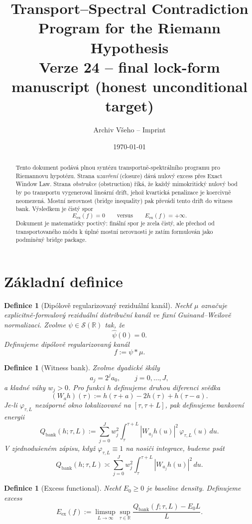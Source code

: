 \documentclass[11pt,a4paper]{article}
\title{Transport--Spectral Contradiction Program for the Riemann Hypothesis\\
\large Verze 24 -- final lock-form manuscript (honest unconditional target)}
\author{Archiv Všeho -- Imprint}
\date{\today}
\newtheorem{definition}[theorem]{Definice}
\begin{document}
\maketitle

\begin{abstract}
Tento dokument podává plnou syntézu transportně-spektrálního programu pro Riemannovu hypotézu.
Strana \emph{uzavření} (closure) dává nulový excess přes Exact Window Law.
Strana \emph{obstrukce} (obstruction) říká, že každý mimokritický nulový bod by po transportu
vygeneroval lineární drift, jehož kvartická penalizace je koercivně neomezená.
Mostní nerovnost (bridge inequality) pak převádí tento drift do witness bank.
Výsledkem je čistý spor
\[
E_{\mathrm{ex}}(f)=0
\qquad\text{versus}\qquad
E_{\mathrm{ex}}(f)=+\infty.
\]
Dokument je matematicky poctivý: finální spor je zcela čistý, ale přechod od transportovaného
módu k úplné mostní nerovnosti je zatím formulován jako podmíněný bridge package.
\end{abstract}

\section{Základní definice}

\begin{definition}[Dipólově regularizovaný reziduální kanál]
Nechť \(\mu\) označuje explicitně-formulový reziduální distribuční kanál ve fixní
Guinand--Weilově normalizaci. Zvolme \(\psi\in\mathscr{S}(\mathbb{R})\) tak, že
\[
\widehat{\psi}(0)=0.
\]
Definujeme dipólově regularizovaný kanál
\[
f:=\psi * \mu.
\]
\end{definition}

\begin{definition}[Witness bank]
Zvolme dyadické škály
\[
a_j=2^j a_0,\qquad j=0,\dots,J,
\]
a kladné váhy \(w_j>0\). Pro funkci \(h\) definujeme druhou diferenci svědka
\[
(W_a h)(\tau):=h(\tau+a)-2h(\tau)+h(\tau-a).
\]
Je-li \(\varphi_{\tau,L}\) nezáporné okno lokalizované na \([\tau,\tau+L]\), pak definujeme bankovní energii
\[
Q_{\mathrm{bank}}(h;\tau,L):=
\sum_{j=0}^{J} w_j^2 \int_{\tau}^{\tau+L} |W_{a_j}h(u)|^2\,\varphi_{\tau,L}(u)\,du.
\]
V zjednodušeném zápisu, když \(\varphi_{\tau,L}\equiv 1\) na nosiči integrace, budeme psát
\[
Q_{\mathrm{bank}}(h;\tau,L)\asymp
\sum_{j=0}^{J} w_j^2 \int_{\tau}^{\tau+L} |W_{a_j}h(u)|^2\,du.
\]
\end{definition}

\begin{definition}[Excess functional]
Nechť \(E_0\ge 0\) je baseline density. Definujeme excess
\[
E_{\mathrm{ex}}(f):=
\limsup_{L\to\infty}\sup_{\tau\in\mathbb{R}}
\frac{Q_{\mathrm{bank}}(f;\tau,L)-E_0L}{L}.
\]
\end{definition}
\end{document}
